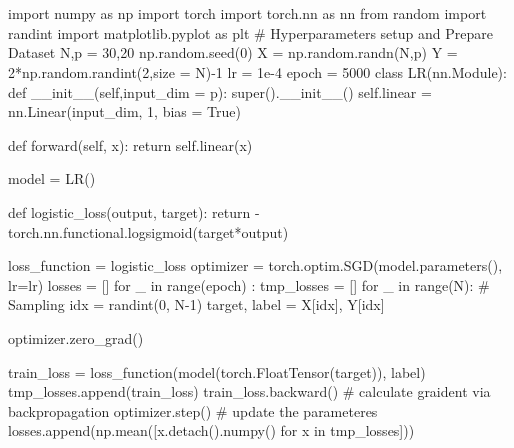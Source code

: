 \documentclass[10pt]{article}
\begin{document}
\clearpage
\appendix
\section{}
\begin{python}
import numpy as np
import torch
import torch.nn as nn
from random import randint
import matplotlib.pyplot as plt
# Hyperparameters setup and Prepare Dataset
N,p = 30,20
np.random.seed(0)
X = np.random.randn(N,p)
Y = 2*np.random.randint(2,size = N)-1
lr = 1e-4
epoch = 5000
class LR(nn.Module):
    def __init__(self,input_dim = p):
        super().__init__()
        self.linear = nn.Linear(input_dim, 1, bias = True)
    
    def forward(self, x):
        return self.linear(x)

model = LR()

def logistic_loss(output, target):
    return -torch.nn.functional.logsigmoid(target*output)

loss_function = logistic_loss                                                   
optimizer = torch.optim.SGD(model.parameters(), lr=lr) 
losses = []
for _ in range(epoch) :
    tmp_losses = []
    for _ in range(N):
        # Sampling
        idx = randint(0, N-1)
        target, label = X[idx], Y[idx]

        optimizer.zero_grad()

        train_loss = loss_function(model(torch.FloatTensor(target)), label)
        tmp_losses.append(train_loss)
        train_loss.backward() # calculate graident via backpropagation
        optimizer.step() # update the parameteres
    losses.append(np.mean([x.detach().numpy() for x in tmp_losses]))
\end{python}
\end{document}
